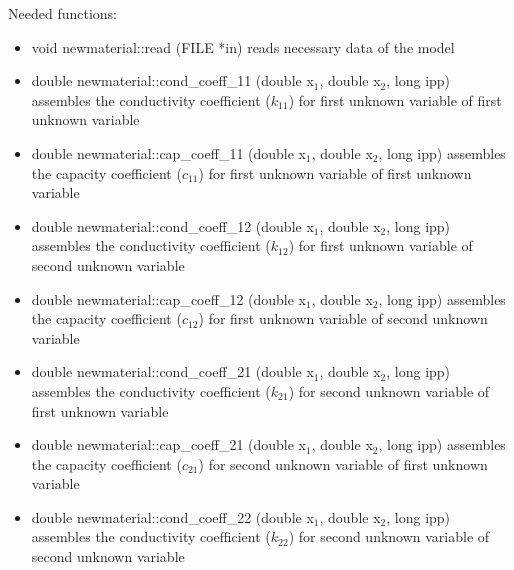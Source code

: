 Needed functions:
\begin{itemize}
\item{
{\sf void newmaterial::read (FILE *in)}
\newline reads necessary data of the model
}



\item{
{\sf double newmaterial::cond\_coeff\_11 (double x$_1$, double x$_2$, long ipp)}
\newline assembles the conductivity coefficient ($k_{11}$) for first unknown variable of first unknown variable
}

\item{
{\sf double newmaterial::cap\_coeff\_11 (double x$_1$, double x$_2$, long ipp)}
\newline assembles the capacity coefficient ($c_{11}$) for first unknown variable of first unknown variable
}



\item{
{\sf double newmaterial::cond\_coeff\_12 (double x$_1$, double x$_2$, long ipp)}
\newline assembles the conductivity coefficient ($k_{12}$) for first unknown variable of second unknown variable
}

\item{
{\sf double newmaterial::cap\_coeff\_12 (double x$_1$, double x$_2$, long ipp)}
\newline assembles the capacity coefficient ($c_{12}$) for first unknown variable of second unknown variable
}



\item{
{\sf double newmaterial::cond\_coeff\_21 (double x$_1$, double x$_2$, long ipp)}
\newline assembles the conductivity coefficient ($k_{21}$) for second unknown variable of first unknown variable
}

\item{
{\sf double newmaterial::cap\_coeff\_21 (double x$_1$, double x$_2$, long ipp)}
\newline assembles the capacity coefficient ($c_{21}$) for second unknown variable of first unknown variable
}



\item{
{\sf double newmaterial::cond\_coeff\_22 (double x$_1$, double x$_2$, long ipp)}
\newline assembles the conductivity coefficient ($k_{22}$) for second unknown variable of second unknown variable
}


\end{itemize}
